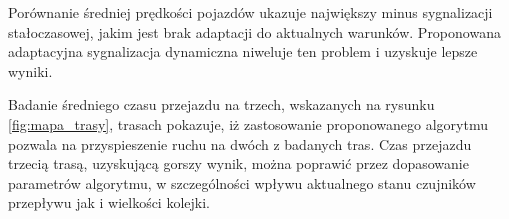 Porównanie średniej prędkości pojazdów ukazuje największy minus sygnalizacji stałoczasowej, jakim jest brak adaptacji do aktualnych warunków. Proponowana adaptacyjna sygnalizacja dynamiczna niweluje ten problem i uzyskuje lepsze wyniki.

Badanie średniego czasu przejazdu na trzech, wskazanych na rysunku \ref{fig:mapa_trasy}, trasach pokazuje, iż zastosowanie proponowanego algorytmu pozwala na przyspieszenie ruchu na dwóch z badanych tras. Czas przejazdu trzecią trasą, uzyskującą gorszy wynik, można poprawić przez dopasowanie parametrów algorytmu, w szczególności wpływu aktualnego stanu czujników przepływu jak i wielkości kolejki.